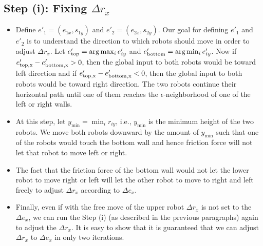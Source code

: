 \subsection{Step (i): Fixing $\Delta r_x$}
\label{theory:step1}
\begin{itemize}
\item Define $e'_1=(e_{1x},s_{1y})$ and $e'_2=(e_{2x},s_{2y})$. Our goal for defining $e'_1$ and $e'_2$ is to understand the direction to which robots should move in order to adjust $\Delta r_x$. Let $e'_{\rm{top}} = \arg \max_i e'_{iy}$ and $e'_{\rm{bottom}} = \arg \min_i e'_{iy}$. Now if $e'_{\rm{top},x}-e'_{\rm{bottom},x}>0$, then the global input to both robots would be toward left direction and if $e'_{\rm{top},x}-e'_{\rm{bottom},x}<0$, then the global input to both robots would be toward right direction. The two robots continue their horizontal path until one of them reaches the $\epsilon$-neighborhood of one of the left or right walls.
\item At this step, let $y_{\min} = \min_i r_{iy}$, i.e., $y_{\min}$ is the minimum height of the two robots. We move both robots downward by the amount of $y_{\min}$ such that one of the robots would touch the bottom wall and hence friction force will not let that robot to move left or right.
\item The fact that the friction force of the bottom wall would not let the lower robot to move right or left will let the other robot to move to right and left freely to adjust $\Delta r_x $ according to $\Delta e_x$.
\item Finally, even if with the free move of the upper robot $\Delta r_x$ is not set to the $\Delta e_x$, we can run the Step (i) (as described in the previous paragraphs) again to adjust the $\Delta r_x$. It is easy to show that it is guaranteed that we can adjust $\Delta r_x$ to $\Delta e_x$ in only two iterations.
\end{itemize}

